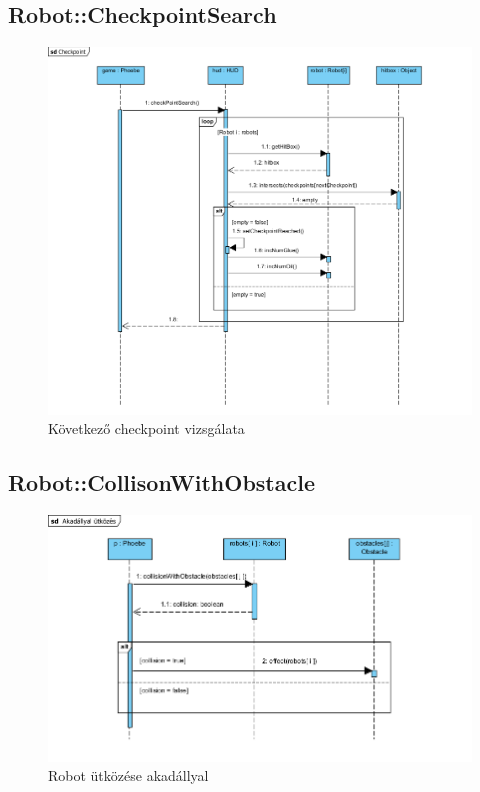 \subsection{Robot::CheckpointSearch}
\begin{figure}[h]
\begin{center}
\includegraphics[width=17cm]{images/CheckpointSearch.PNG}
\caption{Következő checkpoint vizsgálata}
\label{fig:example2}
\end{center}
\end{figure}
\pagebreak

\subsection{Robot::CollisonWithObstacle}
\begin{figure}[h]
\begin{center}
\includegraphics[width=17cm]{images/collisionWithObstacle()_sequence.PNG}
\caption{Robot ütközése akadállyal}
\label{fig:example4}
\end{center}
\end{figure}
\pagebreak

